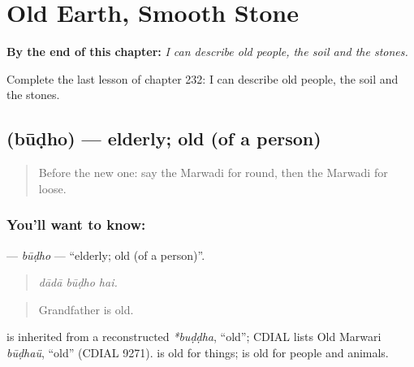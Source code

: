 
\chapter{Old Earth, Smooth Stone}
\label{ch:mw-old-earth-smooth-stone}

\begin{chapteropening}
\textbf{By the end of this chapter:} \emph{I can describe old people, the soil and the stones.}

Complete the last lesson of chapter 232: I can describe old people, the soil and the stones.
\end{chapteropening}

\section[\texorpdfstring{\mw{बूढो} (būḍho)}{बूढो (būḍho)}]{ (būḍho) — elderly; old (of a person)}

\label{lesson:MW-C232-budho}



\begin{quote}
Before the new one: say the Marwadi for round, then the Marwadi for loose.
\end{quote}

\subsection*{You'll want to know: }
\textbf{} — \emph{būḍho} — \textquotedblleft{}elderly; old (of a person)\textquotedblright{}.

\begin{quote}
  
\end{quote}

\begin{quote}
\emph{dādā būḍho hai.}
\end{quote}

\begin{quote}
Grandfather is old.
\end{quote}

\begin{cousinweb}
is inherited from a reconstructed \emph{*buḍḍha}, \textquotedblleft{}old\textquotedblright{}; CDIAL lists Old Marwari \emph{būḍhaü}, \textquotedblleft{}old\textquotedblright{} (CDIAL 9271). \textbf{} is old for things; \textbf{} is old for people and animals.
\end{cousinweb}

